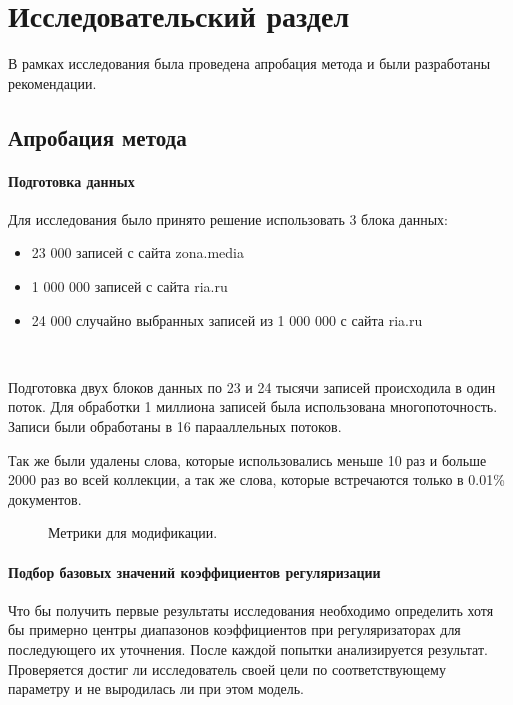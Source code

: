 \chapter{Исследовательский раздел}


В рамках исследования была проведена апробация метода и были разработаны рекомендации.


%
\section{Апробация метода}


\subsubsection{Подготовка данных}


Для исследования было принято решение использовать 3 блока данных:

\begin{itemize}
    \item 23 000 записей с сайта zona.media
    \item 1 000 000 записей с сайта ria.ru
    \item 24 000 случайно выбранных записей из 1 000 000 с сайта ria.ru
\end{itemize}

~\

Подготовка двух блоков данных по 23 и 24 тысячи записей происходила в один поток. Для обработки 1 миллиона записей была использована многопоточность. Записи были обработаны в 16 парааллельных потоков.

Так же были удалены слова, которые использовались меньше 10 раз и больше 2000 раз во всей коллекции, а так же слова, которые встречаются только в 0.01\% документов.

\begin{figure}[h]
    \caption{Метрики для модификации.}
    \label{fig:metriki}
\end{figure}

\subsubsection{Подбор базовых значений коэффициентов регуляризации}

Что бы получить первые результаты исследования необходимо определить хотя бы примерно центры диапазонов коэффициентов при регуляризаторах для последующего их уточнения. После каждой попытки анализируется результат. Проверяется достиг ли исследователь своей цели по соответствующему параметру и не выродилась ли при этом модель.

